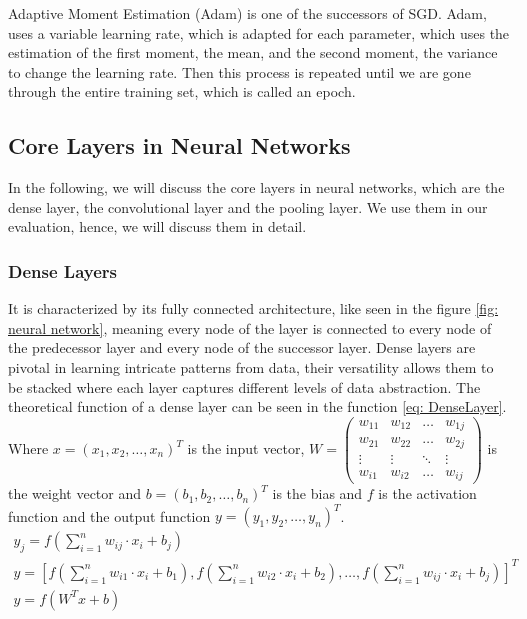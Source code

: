 Adaptive Moment Estimation (Adam) \cite{kingma_adam_2017} is one of the successors of SGD. Adam, uses a variable learning rate, which is adapted for each parameter, which uses the estimation of the first moment, the mean, and the second moment, the variance to change the learning rate.
Then this process is repeated until we are gone through the entire training set, which is called an epoch.

\subsection*{Core Layers in Neural Networks}\label{subsec:core-layers-in-neural-networks}
In the following, we will discuss the core layers in neural networks, which are the dense layer, the convolutional layer and the pooling layer.
We use them in our evaluation, hence, we will discuss them in detail.
\subsubsection{Dense Layers}
It is characterized by its fully connected architecture, like seen in the figure \ref{fig: neural network}, meaning every node of the layer is connected to every node of the predecessor layer and every node of the successor layer.
Dense layers are pivotal in learning intricate patterns from data, their versatility allows them to be stacked where each layer captures different levels of data abstraction.
The theoretical function of a dense layer can be seen in the function \ref{eq: DenseLayer}.
Where $x = (x_1,x_2,\dots,x_n)^T$ is the input vector,
$W = \left(\begin{smallmatrix}w_{11} & w_{12} & \dots & w_{1j}\\w_{21} & w_{22} & \dots & w_{2j}\\\vdots & \vdots & \ddots & \vdots\\w_{i1} & w_{i2} & \dots & w_{ij}\end{smallmatrix}\right)$
is the weight vector and $b = (b_1,b_2,\dots,b_n)^T$ is the bias and $f$ is the activation function and the output function $y = (y_1,y_2,\dots,y_n)^T$.
\begin{gather}
    y_j = f\left( \sum^n_{i=1} w_{ij}\cdot x_i + b_j\right)\\
    y = \left[ f\left( \sum^n_{i=1} w_{i1} \cdot x_i + b_1\right),f\left( \sum^n_{i=1} w_{i2} \cdot x_i + b_2\right),\dots,f\left( \sum^n_{i=1} w_{ij} \cdot x_i + b_j\right) \right]^T\\
    y = f(W^T x+b)
    \label{eq: DenseLayer}
\end{gather}

